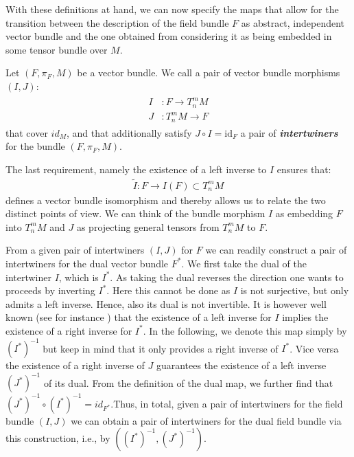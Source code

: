 With these definitions at hand, we can now specify the maps that allow for the transition between the description of the field bundle $F$ as abstract, independent vector bundle and the one obtained from considering it as being embedded in some tensor bundle over $M$.

\begin{definition}[intertwiner]\label{interDef}
Let $(F,\pi_F,M)$ be a vector bundle. We call a pair of vector bundle morphisms $(I, J)$:
\begin{align}
    \begin{aligned}
    I&: F \longrightarrow T^m_n M\\
    J&: T^m_n M \longrightarrow F 
    \end{aligned}
\end{align}
that cover $id_M$, and that additionally satisfy
$J \circ I = \mathrm{id}_F$ a pair of \textbf{\textit{intertwiners}} for the bundle $(F, \pi_F, M)$.
\end{definition}
The last requirement, namely the existence of a left inverse to $I$ ensures that: 
\begin{align}\tilde{I} : F \longrightarrow I(F) \subset T^m_nM
\end{align}
defines a vector bundle isomorphism and thereby allows us to relate the two distinct points of view.
We can think of the bundle morphism $I$ as embedding $F$ into $T^m_nM$ and $J$ as projecting general tensors from $T^m_nM$ to $F$. 

From a given pair of intertwiners $(I,J)$ for $F$ we can readily construct a pair of intertwiners for the dual vector bundle $F^{\ast}$. 
We first take the dual of the intertwiner $I$, which is $I^{\ast}$. As taking the dual reverses the direction one wants to proceeds by inverting $I^{\ast}$. Here this cannot be done as $I$ is not surjective, but only admits a left inverse. Hence, also its dual is not invertible. It is however well known (see for instance \cite{MacLane:205493}) that the existence of a left inverse for $I$ implies the existence of a right inverse for $I^{\ast}$. 
In the following, we denote this map simply by $(I^{\ast})^{-1}$ but keep in mind that it only provides a right inverse of $I^{\ast}$. Vice versa the existence of a right inverse of $J$ guarantees the existence of a left inverse $(J^{\ast})^{-1}$ of its dual. From the definition of the dual map, we further find that $(J^{\ast})^{-1} \circ (I^{\ast})^{-1} = id_{F^{\ast}}$.Thus, in total, given a pair of intertwiners for the field bundle $(I,J)$ we can obtain a pair of intertwiners for the dual field bundle via this construction, i.e., by $((I^{\ast})^{-1}, (J^{\ast})^{-1})$. 

